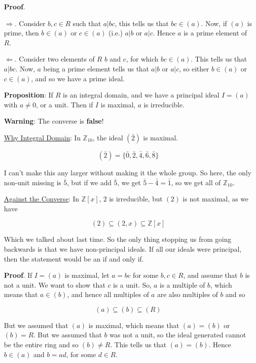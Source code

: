 \documentclass[12pt]{article}
\def\Z{{\mathbb Z}}
\theoremstyle{remark}
\theoremstyle{remark}
\theoremstyle{remark}
\theoremstyle{remark}
\theoremstyle{remark}
\begin{document}

{\bf Proof}.

$\Rightarrow$. Consider $b, c \in R$ such that $a | bc$, this tells us that $bc
\in (a)$. Now, if $(a)$ is prime, then $b \in (a)$ or $c \in (a)$ (i.e.) $a | b$
or $a | c$. Hence $a$ is a prime element of $R$.

$\Leftarrow$. Consider two elements of $R$ $b$ and $c$, for which $bc \in (a)$.
This tells us that $a | bc$. Now, $a$ being a prime element tells us that $a |
b$ or $a | c$, so either $b \in (a)$ or $c \in (a)$, and so we have a prime
ideal.


{\bf Proposition}: If $R$ is an integral domain, and we have a principal ideal
$I = (a)$ with $a \ne 0$, or a unit. Then if $I$ is maximal, $a$ is irreducible.

{\bf Warning}: The converse is {\bf false}!

\underline{Why Integral Domain}: In $\Z_{10}$, the ideal $(\bar 2)$ is maximal.

\[
  (\bar 2) = \{\bar 0, \bar 2, \bar 4, \bar 6, \bar 8 \}
\]

I can't make this any larger without making it the whole group. So here, the
only non-unit missing is $\bar 5$, but if we add $\bar 5$, we get $\bar 5 - \bar
4 = \bar 1$, so we get all of $\Z_{10}$.

\underline{Against the Converse}: In $\Z[x]$, $2$ is irreducible, but $(2)$ is
not maximal, as we have 

\[
  (2) \subseteq (2, x) \subseteq \Z[x]
\]

Which we talked about last time. So the only thing stopping us from going
backwards is that we have non-principal ideals. If all our ideals were
principal, then the statement would be an if and only if.

{\bf Proof}. If $I = (a)$ is maximal, let $a = bc$ for some $b, c \in R$, and
assume that $b$ is not a unit. We want to show that $c$ is a unit. So, $a$ is a
multiple of $b$, which means that $a \in (b)$, and hence all multiples of $a$
are also multiples of $b$ and so 

\[
  (a) \subseteq (b) \subseteq (R)
\]

But we assumed that $(a)$ is maximal, which means that $(a) = (b)$ or $(b) = R$.
But we assumed that $b$ was not a unit, so the ideal generated cannot be the
entire ring and so $(b) \ne R$. This tells us that $(a) = (b)$. Hence $b \in
(a)$ and $b = ad$, for some $d \in R$.
\end{document}
